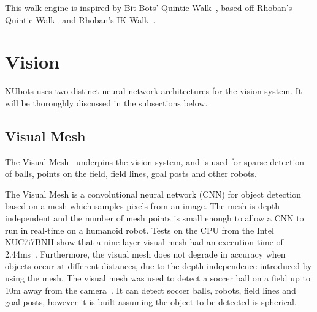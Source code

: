 \documentclass{llncs}
\begin{document}
This walk engine is inspired by Bit-Bots' Quintic Walk~\cite{bitbotsMotionGit}, based off Rhoban's Quintic Walk~\cite{rhobanModelGit} and Rhoban's IK Walk~\cite{rhobanModelGit}. 


\section{Vision}



\medskip
NUbots uses two distinct neural network architectures for the vision system. It will be thoroughly discussed in the subsections below.

\subsection{Visual Mesh}
The Visual Mesh~\cite{Houliston2018VisualMR} underpins the vision system, and is used for sparse detection of balls, points on the field, field lines, goal posts and other robots.

The Visual Mesh is a convolutional neural network (CNN) for object detection based on a mesh which samples pixels from an image. The mesh is depth independent and the number of mesh points is small enough to allow a CNN to run in real-time on a humanoid robot. Tests on the CPU from the Intel\textsuperscript{\textregistered} NUC7i7BNH show that a nine layer visual mesh had an execution time of 2.44ms~\cite{Houliston2018VisualMR}. Furthermore, the visual mesh does not degrade in accuracy when objects occur at different distances, due to the depth independence introduced by using the mesh. The visual mesh was used to detect a soccer ball on a field up to 10m away from the camera~\cite{Houliston2018VisualMR}. It can detect soccer balls, robots, field lines and goal posts, however it is built assuming the object to be detected is spherical.
\end{document}
